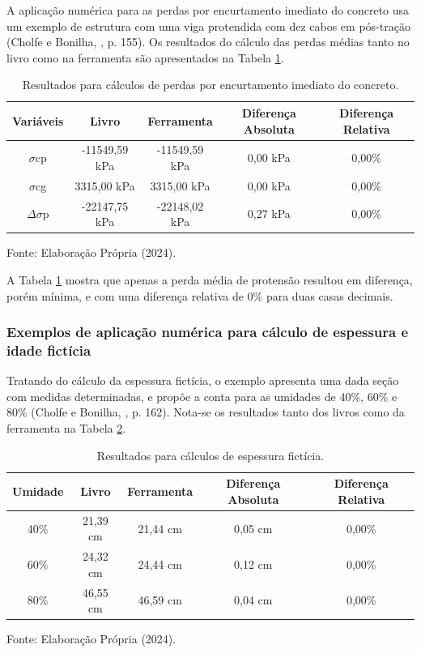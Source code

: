 \hspace{0.4cm}A aplicação numérica para as perdas por encurtamento imediato do concreto usa um exemplo de estrutura com uma viga protendida com dez cabos em pós-tração (Cholfe e Bonilha, \citeyear{CB}, p. 155). Os resultados do cálculo das perdas médias tanto no livro como na ferramenta são apresentados na Tabela \ref{tab:perdas_piec}.

\begin{table}[h!]
\centering
\begin{tabular}{ccccc}
\hline
Variáveis & Livro & Ferramenta & Diferença Absoluta & Diferença Relativa \\ \hline
$\sigma$cp & -11549,59 kPa & -11549,59 kPa & 0,00 kPa & 0,00\% \\
$\sigma$cg & 3315,00 kPa & 3315,00 kPa & 0,00 kPa & 0,00\% \\
$\Delta\sigma$p & -22147,75 kPa & -22148,02 kPa & 0,27 kPa & 0,00\% \\ \hline
\end{tabular}
\caption{\label{tab:perdas_piec} Resultados para cálculos de perdas por encurtamento imediato do concreto.}Fonte: Elaboração Própria (2024).
\end{table}

A Tabela \ref{tab:perdas_piec} mostra que apenas a perda média de protensão resultou em diferença, porém mínima, e com uma diferença relativa de 0\% para duas casas decimais.

\subsubsection{Exemplos de aplicação numérica para cálculo de espessura e idade fictícia}

\hspace{0.4cm}Tratando do cálculo da espessura fictícia, o exemplo apresenta uma dada seção com medidas determinadas, e propõe a conta para as umidades de 40\%, 60\% e 80\% (Cholfe e Bonilha, \citeyear{CB}, p. 162). Nota-se os resultados tanto dos livros como da ferramenta na Tabela \ref{tab:esp_fic}.

\begin{table}[h!]
\centering
\begin{tabular}{ccccc}
\hline
Umidade & Livro & Ferramenta & Diferença Absoluta & Diferença Relativa \\ \hline
40\% & 21,39 cm & 21,44 cm & 0,05 cm & 0,00\% \\
60\% & 24,32 cm & 24,44 cm & 0,12 cm & 0,00\% \\
80\% & 46,55 cm & 46,59 cm & 0,04 cm & 0,00\% \\ \hline
\end{tabular}
\caption{\label{tab:esp_fic} Resultados para cálculos de espessura fictícia.}Fonte: Elaboração Própria (2024).
\end{table}

